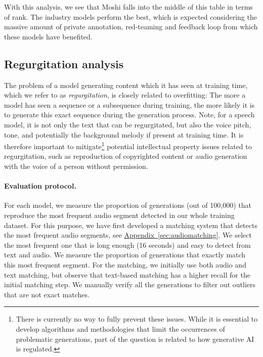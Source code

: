 With this analysis, we see that Moshi falls into the middle of this table in terms of rank. The industry models perform the best, which is expected considering the massive amount of private annotation,  red-teaming and feedback loop from which these models have benefited.  %

\subsection{Regurgitation analysis} 
\label{sec:regurgitation}

The problem of a model generating content which it has seen at training time, which we refer to as \textit{regurgitation}, is closely related to overfitting: The more a model has seen a sequence or a subsequence during training, the more likely it is to generate this exact sequence during the generation process. Note, for a speech model, it is not only the text that can be regurgitated, but also the voice pitch, tone, and potentially the background melody if present at training time. It is therefore important to mitigate\footnote{There is currently no way to fully prevent these issues. While it is essential to develop algorithms and methodologies that limit the occurrences of problematic generations, part of the question is related to how generative AI is regulated.} potential intellectual property issues related to regurgitation, such as reproduction of copyrighted content or audio generation with the voice of a person without permission. 

\paragraph{Evaluation protocol.}
For each model, we measure the proportion of generations  (out of 100,000) that reproduce the most frequent audio segment detected in our whole training dataset. For this purpose, we have first developed a matching system that detects the most frequent audio segments, see \hyperref[sec:audiomatching]{Appendix~\ref{sec:audiomatching}}. We select the most frequent one that is long enough (16 seconds) and easy to detect from text and audio. We measure the proportion of generations that exactly match this most frequent segment.
For the matching, we initially use both audio and text matching, but observe that text-based matching has a higher recall for the initial matching step. We manually verify all the generations to filter out outliers that are not exact matches.  \smallskip

